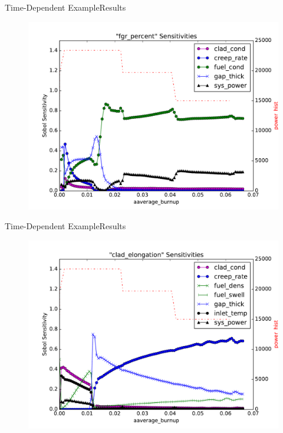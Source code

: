 \documentclass{beamer}
\begin{document}
\begin{frame}{Time-Dependent Example}{Results}\vspace{-20pt}
      \begin{figure}
        \centering
        \includegraphics[width=0.8\linewidth]{oecd/sens_fgr_percent}
      \end{figure}
\end{frame}

\begin{frame}{Time-Dependent Example}{Results}\vspace{-20pt}
      \begin{figure}
        \centering
        \includegraphics[width=0.8\linewidth]{oecd/sens_clad_elongation}
      \end{figure}
\end{frame}
\end{document}
